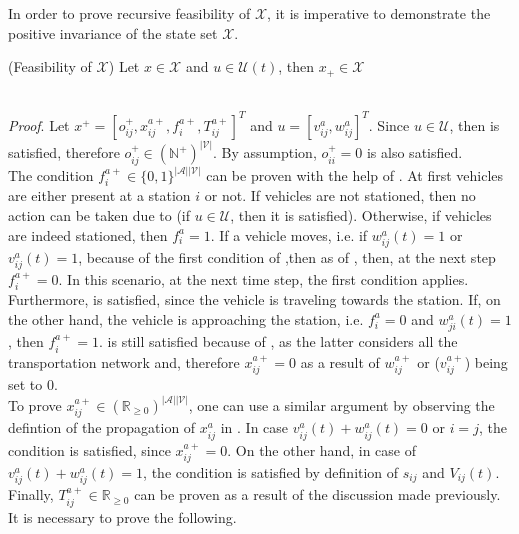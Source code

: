 In order to prove recursive feasibility of $\mathcal{X}$, it is imperative to demonstrate the positive invariance of the state set $\mathcal{X}$. \\
\begin{proposition}{(Feasibility of $\mathcal{X}$)}\label{pro:feas_x}
	Let $x \in \mathcal{X}$ and $u \in \mathcal{U}(t)$, then $x_+ \in \mathcal{X}$
\end{proposition}\\

\textit{Proof}. Let $x^+ = [o_{ij}^+, x_{ij}^{a+}, f^{a+}_{i}, T_{ij}^{a+}]^T$ and $u = [v^{a}_{ij}, w^{a}_{ij}]^T$. Since $u \in \mathcal{U}$, then  is satisfied, therefore $o_{ij}^+ \in (\mathbb{N}^+)^{|\mathcal{V}|}$. By assumption, $o_{ii}^+ = 0$ is also satisfied.\\
The condition $f^{a+}_{i} \in \{0,1\}^{|\mathcal{A}||\mathcal{V}|}$ can be proven with the help of . At first vehicles are either present at a station $i$ or not. If vehicles are not stationed, then no action can be taken due to  (if $u \in \mathcal{U}$, then it is satisfied). Otherwise, if vehicles are indeed stationed, then $f^{a}_{i} = 1$. If a vehicle moves, i.e. if $w^a_{ij}(t) = 1$ or $v^a_{ij}(t) = 1$, because of the first condition of ,then as of , then, at the next step $f^{a+}_{i} =0$. In this scenario, at the next time step, the first condition applies. Furthermore,  is satisfied, since the vehicle is traveling towards the station. If, on the other hand, the vehicle is approaching the station, i.e. $f^{a}_{i} =0$ and 
$w^a_{ji}(t) = 1$, then $f^{a+}_{i} =1$.  is still satisfied because of , as the latter considers all the transportation network and, therefore $ x_{ij}^{a+} = 0$ as a result of  $w_{ij}^{a+}$ or ($ v_{ij}^{a+}$) being set to 0.\\
To prove $x_{ij}^{a+}\in (\mathbb{R}_{\ge 0})^{|\mathcal{A}||\mathcal{V}|}$, one can use a similar argument by observing the defintion of the propagation of  $x_{ij}^a$ in  . In case $v^a_{ij}(t) + w^a_{ij}(t)= 0$ or $i=j$, the condition is satisfied, since  $x_{ij}^{a+} = 0$.  On the other hand, in case of $v^a_{ij}(t) + w^a_{ij}(t)= 1$, the condition is satisfied by definition of $s_{ij}$ and $V_{ij}(t)$. \\
Finally, $T_{ij}^{a+} \in \mathbb{R}_{\ge0}$ can be proven as a result of the discussion made previously. It is necessary to prove the following. 
